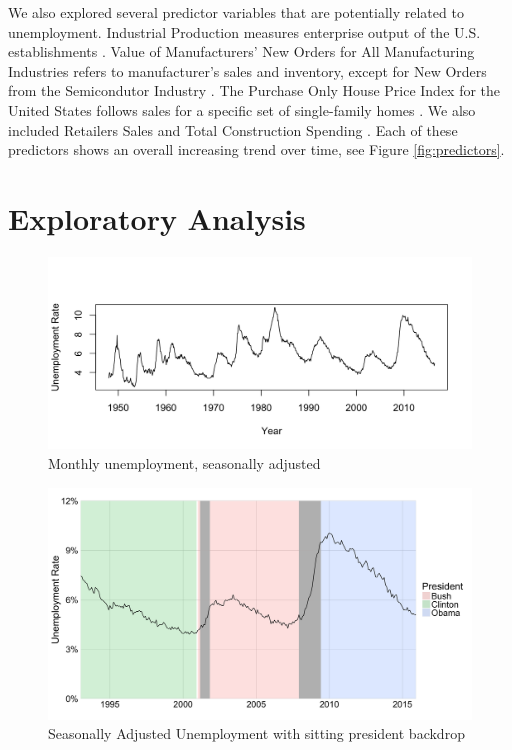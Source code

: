 \documentclass[twoside,twocolumn]{article}
\begin{document}
We also explored several predictor variables that are potentially related to unemployment.  Industrial Production measures enterprise output of the U.S. establishments \citep{BGFS2016}. Value of Manufacturers' New Orders for All Manufacturing Industries refers to manufacturer's sales and inventory, except for New Orders from the Semicondutor Industry \citep{vmno}. The Purchase Only House Price Index for the United States follows sales for a specific set of single-family homes \citep{fhfa2016}. We also included Retailers Sales \citep{retail2016} and Total Construction Spending \citep{construction2016}. Each of these predictors shows an overall increasing trend over time, see Figure \ref{fig:predictors}.

\section{Exploratory Analysis}
		\begin{figure}[htb]
		\centering
		\caption{Monthly unemployment, seasonally adjusted}
		\label{fig:unemployment}
		\includegraphics[width=\linewidth]{images/unemployment_total_sa}
	\end{figure}
	
				\begin{figure}[htb]
		\centering
		\caption{Seasonally Adjusted Unemployment with sitting president backdrop}
		\label{fig:presunemp}
		\includegraphics[width=\linewidth]{images/presunemp}
		\end{figure}
\end{document}
